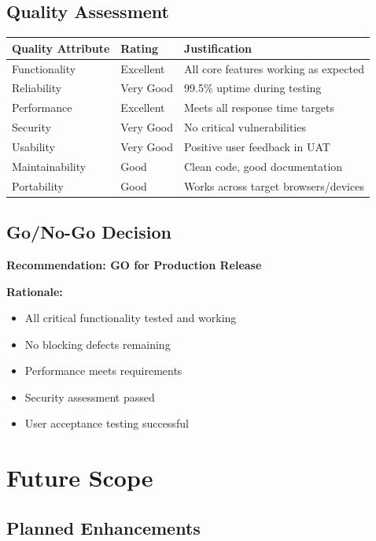 \documentclass[12pt,a4paper]{report}
\begin{document}
\section{Quality Assessment}

\begin{longtable}{|p{3.5cm}|l|p{6cm}|}
\hline
\textbf{Quality Attribute} & \textbf{Rating} & \textbf{Justification} \\
\hline
\endfirsthead
Functionality & Excellent & All core features working as expected \\
\hline
Reliability & Very Good & 99.5\% uptime during testing \\
\hline
Performance & Excellent & Meets all response time targets \\
\hline
Security & Very Good & No critical vulnerabilities \\
\hline
Usability & Very Good & Positive user feedback in UAT \\
\hline
Maintainability & Good & Clean code, good documentation \\
\hline
Portability & Good & Works across target browsers/devices \\
\hline
\end{longtable}

\section{Go/No-Go Decision}

\textbf{Recommendation: GO for Production Release}

\textbf{Rationale:}
\begin{itemize}
    \item All critical functionality tested and working
    \item No blocking defects remaining
    \item Performance meets requirements
    \item Security assessment passed
    \item User acceptance testing successful
\end{itemize}

\chapter{Future Scope}

\section{Planned Enhancements}
\end{document}
